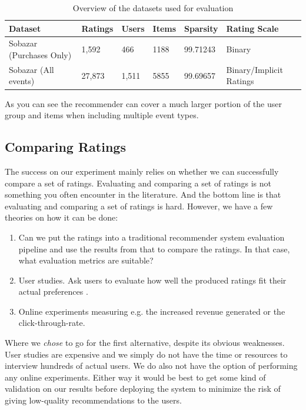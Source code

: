 \begin{table}[H]
    \centering
    \begin{tabular}{l l l l l l }
    \toprule
	Dataset						& 	Ratings		& 	Users		& 	Items 		& 	Sparsity			& Rating Scale 				    \\ \midrule
	Sobazar	(Purchases Only) 	&	1,592		&	466			&	1188		&	99.71243			& Binary						\\
	Sobazar (All events)		& 	27,873  	& 	1,511		&	5855		& 	99.69657			& Binary/Implicit Ratings		\\ 
	\bottomrule
    \end{tabular}
    \caption [Overview of the datasets used for evaluation]{Overview of the datasets used for evaluation}
    \label{table:datasets}
\end{table}

As you can see the recommender can cover a much larger portion of the user group and items when including multiple event types.

\subsection{Comparing Ratings}

The success on our experiment mainly relies on whether we can successfully compare a set of ratings.
Evaluating and comparing a set of ratings is not something you often encounter in the literature. And the
bottom line is that evaluating and comparing a set of ratings is hard. However, we have a few theories on
how it can be done:

\begin{enumerate}
\item Can we put the ratings into a traditional recommender system evaluation pipeline and use the
	  results from that to compare the ratings. In that case, what evaluation metrics are suitable?
\item User studies. Ask users to evaluate how well the produced ratings fit their actual preferences \cite{parra2011walk}.
\item Online experiments measuring e.g. the increased revenue generated or the click-through-rate.
\end{enumerate}

Where we \emph{chose} to go for the first alternative, despite its obvious weaknesses. User studies
are expensive and we simply do not have the time or resources to interview hundreds of actual users.
We do also not have the option of performing any online experiments. Either way it would be best to
get some kind of validation on our results before deploying the system to minimize the risk of giving
low-quality recommendations to the users.

